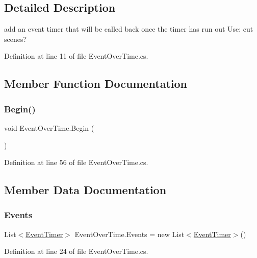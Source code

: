 \subsection{Detailed Description}
add an event timer that will be called back once the timer has run out Use\+: cut scenes? 



Definition at line 11 of file Event\+Over\+Time.\+cs.



\subsection{Member Function Documentation}
\mbox{\label{class_event_over_time_a3b41cb8f467ea8154fbae0919282c355}} 
\subsubsection{\texorpdfstring{Begin()}{Begin()}}
{\footnotesize\ttfamily void Event\+Over\+Time.\+Begin (\begin{DoxyParamCaption}{ }\end{DoxyParamCaption})}



Definition at line 56 of file Event\+Over\+Time.\+cs.



\subsection{Member Data Documentation}
\mbox{\label{class_event_over_time_ab24dd000934b03e1e753888a7531be81}} 
\subsubsection{\texorpdfstring{Events}{Events}}
{\footnotesize\ttfamily List$<$\mbox{\hyperlink{class_event_over_time_1_1_event_timer}{Event\+Timer}}$>$ Event\+Over\+Time.\+Events = new List$<$\mbox{\hyperlink{class_event_over_time_1_1_event_timer}{Event\+Timer}}$>$()}



Definition at line 24 of file Event\+Over\+Time.\+cs.


